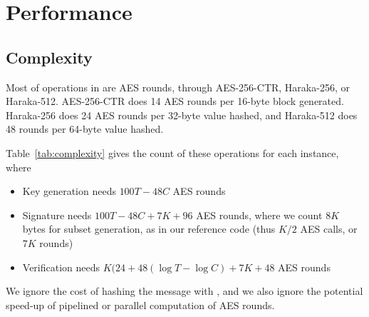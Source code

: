 \chapter{Performance}\label{chap:performance}

\section{Complexity}

Most of operations in \gravity are AES rounds, through AES-256-CTR, Haraka-256, or Haraka-512. 
AES-256-CTR does 14 AES rounds per 16-byte block generated.
Haraka-256 does 24 AES rounds per 32-byte value hashed, and Haraka-512 does 48 rounds per 64-byte value hashed.

Table~\ref{tab:complexity} gives the count of these operations for each \gravity instance, where
\begin{itemize}
    \item Key generation needs $100T- 48C$ AES rounds

    \item Signature needs $100T - 48C + 7K + 96$ AES rounds, where we count $8K$ bytes for subset generation, as in our reference code (thus $K/2$ AES calls, or $7K$ rounds)
    
    \item Verification needs $K(24 + 48(\log T - \log C) + 7K + 48$ AES rounds
\end{itemize}

We ignore the cost of hashing the message with \hashx, and we also ignore the potential speed-up of pipelined or parallel computation of AES rounds.

